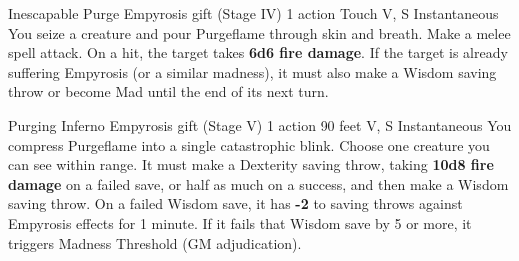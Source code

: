 \DndSpellHeader%
  {Inescapable Purge}
  {Empyrosis gift (Stage IV)}
  {1 action}
  {Touch}
  {V, S}
  {Instantaneous}
You seize a creature and pour Purgeflame through skin and breath. Make a melee spell attack. On a hit, the target takes \textbf{6d6 fire damage}. If the target is already suffering Empyrosis (or a similar madness), it must also make a Wisdom saving throw or become Mad until the end of its next turn.

\medskip

\DndSpellHeader%
  {Purging Inferno}
  {Empyrosis gift (Stage V)}
  {1 action}
  {90 feet}
  {V, S}
  {Instantaneous}
You compress Purgeflame into a single catastrophic blink. Choose one creature you can see within range. It must make a Dexterity saving throw, taking \textbf{10d8 fire damage} on a failed save, or half as much on a success, and then make a Wisdom saving throw. On a failed Wisdom save, it has \textbf{-2} to saving throws against Empyrosis effects for 1 minute. If it fails that Wisdom save by 5 or more, it triggers Madness Threshold (GM adjudication).

\newpage
